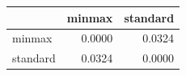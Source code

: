 \begin{tabular}{lrr}
\toprule
 & minmax & standard \\
\midrule
minmax & 0.0000 & 0.0324 \\
standard & 0.0324 & 0.0000 \\
\bottomrule
\end{tabular}
